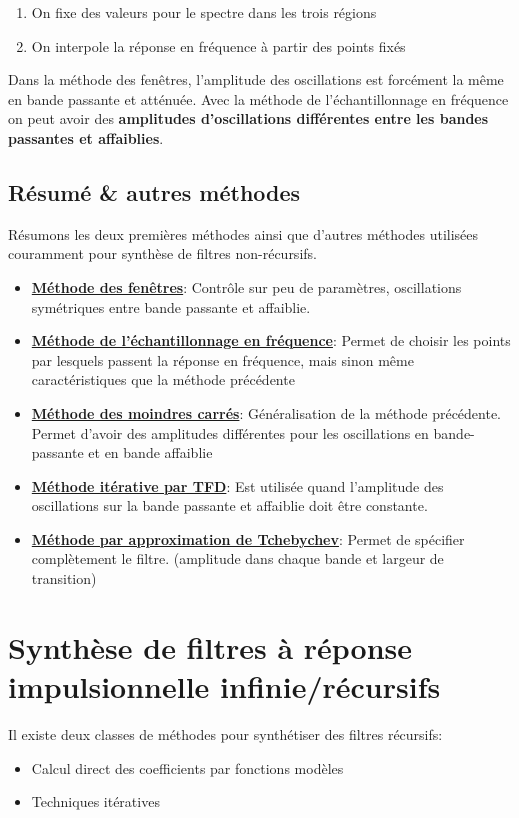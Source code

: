 \documentclass[11pt,a4paper]{article}
\begin{document}
\begin{enumerate}
\item On fixe des valeurs pour le spectre dans les trois régions
\item On interpole la réponse en fréquence à partir des points fixés
\end{enumerate}

Dans la méthode des fenêtres, l'amplitude des oscillations est forcément la même en bande passante et atténuée. Avec la méthode de l'échantillonnage en fréquence on peut avoir des \textbf{amplitudes d'oscillations différentes entre les bandes passantes et affaiblies}.


\subsection{Résumé \& autres méthodes}
Résumons les deux premières méthodes ainsi que d'autres méthodes utilisées couramment pour synthèse de filtres non-récursifs.

\begin{itemize}
\item \textbf{\underline{Méthode des fenêtres}}: Contrôle sur peu de paramètres, oscillations symétriques entre bande passante et affaiblie. 
\item \textbf{\underline{Méthode de l'échantillonnage en fréquence}}: Permet de choisir les points par lesquels passent la réponse en fréquence, mais sinon même caractéristiques que la méthode précédente
\item \textbf{\underline{Méthode des moindres carrés}}: Généralisation de la méthode précédente. Permet d'avoir des amplitudes différentes pour les oscillations en bande-passante et en bande affaiblie
\item \textbf{\underline{Méthode itérative par TFD}}: Est utilisée quand l'amplitude des oscillations sur la bande passante et affaiblie doit être constante.
\item \textbf{\underline{Méthode par approximation de Tchebychev}}: Permet de spécifier complètement le filtre. (amplitude dans chaque bande et largeur de transition)
\end{itemize}

\section{Synthèse de filtres à réponse impulsionnelle infinie/récursifs}
Il existe deux classes de méthodes pour synthétiser des filtres récursifs:
\begin{itemize}
\item Calcul direct des coefficients par fonctions modèles
\item Techniques itératives
\end{itemize}
\end{document}
